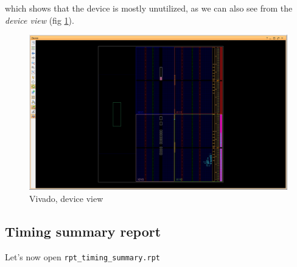 \documentclass[12pt, a4paper]{article}
\begin{document}
which shows that the device is mostly unutilized, as we can also see from the \textit{device view} (fig \ref{fig:deviceview}).




\begin{figure}[h!]
\centering
\includegraphics[scale=0.4]{../screenshots/vivado/device.png}
\caption{Vivado, device view}\label{fig:deviceview}
\end{figure}





\newpage
\subsection{Timing summary report}

Let's now open \texttt{rpt\_timing\_summary.rpt}
\end{document}
